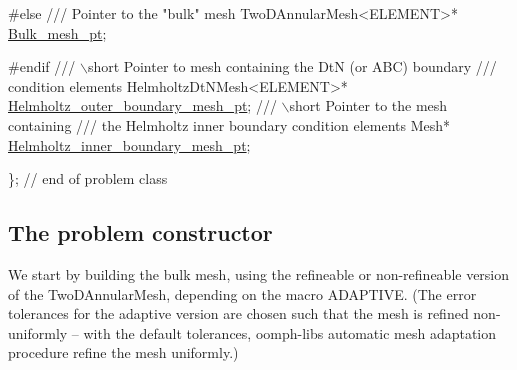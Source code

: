\begin{DoxyCodeInclude}
\textcolor{preprocessor}{#else}
\textcolor{comment}{}
\textcolor{comment}{ /// Pointer to the "bulk" mesh}
\textcolor{comment}{} TwoDAnnularMesh<ELEMENT>* \hyperlink{classScatteringProblem_a8c61657a1d09ce49a5871ca3febe5658}{Bulk\_mesh\_pt};

\textcolor{preprocessor}{#endif}
\textcolor{comment}{}
\textcolor{comment}{ /// \(\backslash\)short Pointer to mesh containing the DtN (or ABC) boundary}
\textcolor{comment}{ /// condition elements}
\textcolor{comment}{} HelmholtzDtNMesh<ELEMENT>* \hyperlink{classScatteringProblem_a9692c8592b57a4363e557e5b012c744b}{Helmholtz\_outer\_boundary\_mesh\_pt};
 \textcolor{comment}{}
\textcolor{comment}{ /// \(\backslash\)short Pointer to the mesh containing }
\textcolor{comment}{ /// the Helmholtz inner boundary condition elements }
\textcolor{comment}{} Mesh* \hyperlink{classScatteringProblem_a56b5fc73bbb51b701a43dc38f9815104}{Helmholtz\_inner\_boundary\_mesh\_pt};

\}; \textcolor{comment}{// end of problem class}

\end{DoxyCodeInclude}




 

\hypertarget{index_constr}{}\subsection{The problem constructor}\label{index_constr}
We start by building the bulk mesh, using the refineable or non-\/refineable version of the {\ttfamily Two\+D\+Annular\+Mesh}, depending on the macro {\ttfamily A\+D\+A\+P\+T\+I\+VE}. (The error tolerances for the adaptive version are chosen such that the mesh is refined non-\/uniformly -- with the default tolerances, {\ttfamily oomph-\/lib\textquotesingle{}s} automatic mesh adaptation procedure refine the mesh uniformly.)

